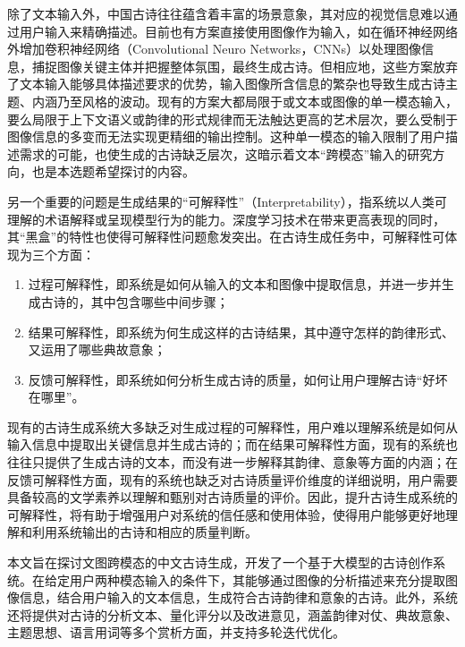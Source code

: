 除了文本输入外，中国古诗往往蕴含着丰富的场景意象，其对应的视觉信息难以通过用户输入来精确描述。目前也有方案直接使用图像作为输入，如在循环神经网络外增加卷积神经网络（Convolutional Neuro Networks，CNNs）以处理图像信息，捕捉图像关键主体并把握整体氛围，最终生成古诗。\cite{liuImages2PoemGeneratingChinese2018,xuHowImagesInspire2018}但相应地，这些方案放弃了文本输入能够具体描述要求的优势，输入图像所含信息的繁杂也导致生成古诗主题、内涵乃至风格的波动。现有的方案大都局限于或文本或图像的单一模态输入，要么局限于上下文语义或韵律的形式规律而无法触达更高的艺术层次，要么受制于图像信息的多变而无法实现更精细的输出控制。这种单一模态的输入限制了用户描述需求的可能，也使生成的古诗缺乏层次，这暗示着文本“跨模态”输入的研究方向，也是本选题希望探讨的内容。

另一个重要的问题是生成结果的“可解释性”（Interpretability），指系统以人类可理解的术语解释或呈现模型行为的能力。\cite{doshi-velezRigorousScienceInterpretable2017}深度学习技术在带来更高表现的同时，其“黑盒”的特性也使得可解释性问题愈发突出。在古诗生成任务中，可解释性可体现为三个方面：

\begin{enumerate}[label=（\arabic*）, itemindent=2em]   %
    \item 过程可解释性，即系统是如何从输入的文本和图像中提取信息，并进一步并生成古诗的，其中包含哪些中间步骤；
    \item 结果可解释性，即系统为何生成这样的古诗结果，其中遵守怎样的韵律形式、又运用了哪些典故意象；
    \item 反馈可解释性，即系统如何分析生成古诗的质量，如何让用户理解古诗“好坏在哪里”。
\end{enumerate}

现有的古诗生成系统大多缺乏对生成过程的可解释性，用户难以理解系统是如何从输入信息中提取出关键信息并生成古诗的；而在结果可解释性方面，现有的系统也往往只提供了生成古诗的文本，而没有进一步解释其韵律、意象等方面的内涵；在反馈可解释性方面，现有的系统也缺乏对古诗质量评价维度的详细说明，用户需要具备较高的文学素养以理解和甄别对古诗质量的评价。因此，提升古诗生成系统的可解释性，将有助于增强用户对系统的信任感和使用体验，使得用户能够更好地理解和利用系统输出的古诗和相应的质量判断。

本文旨在探讨文图跨模态的中文古诗生成，开发了一个基于大模型的古诗创作系统。在给定用户两种模态输入的条件下，其能够通过图像的分析描述来充分提取图像信息，结合用户输入的文本信息，生成符合古诗韵律和意象的古诗。此外，系统还将提供对古诗的分析文本、量化评分以及改进意见，涵盖韵律对仗、典故意象、主题思想、语言用词等多个赏析方面，并支持多轮迭代优化。

